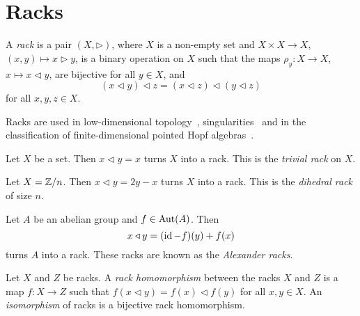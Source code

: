 \chapter{Racks}

\begin{definition}
\label{defn:rack}
A \emph{rack} is a pair $(X,\triangleright)$, 
where $X$ is a non-empty set and 
$X\times X\to X$, $(x,y)\mapsto x\triangleright y$, is a binary operation on $X$ such that
the maps $\rho_y\colon X\to X$, $x\mapsto x\triangleleft y$, are bijective for all $y\in X$, and 
\begin{equation}
\label{eq:rack}
(x\triangleleft y)\triangleleft z=(x\triangleleft z)\triangleleft (y\triangleleft z)
\end{equation}
for all $x,y,z\in X$.
\end{definition}

Racks are used in low-dimensional topology~\cite{MR3379534}, singularities~\cite{MR975077} 
and in the classification of finite-dimensional pointed Hopf algebras~\cite{MR1994219}.

\begin{example}
    Let $X$ be a set. Then $x\triangleleft y=x$ turns $X$ into a rack. 
    This is the \emph{trivial rack} on $X$. 
\end{example}

\begin{example}
    Let $X=\mathbb{Z}/n$. Then $x\triangleleft y=2y-x$ turns $X$ into a rack. This is 
    the \emph{dihedral rack} of size $n$. 
\end{example}

\begin{example}
    Let $A$ be an abelian group and $f\in\operatorname{Aut}(A)$. Then 
    \[
    x\triangleleft y=(\operatorname{id}-f)(y)+f(x)
    \]
    turns $A$ into a rack. These racks 
    are known as the \emph{Alexander racks}.
\end{example}

\begin{definition}
    Let $X$ and $Z$ be racks. 
    A \emph{rack homomorphism} between the racks $X$ and $Z$ is a map $f\colon X\to Z$ such that 
    $f(x\triangleleft y)=f(x)\triangleleft f(y)$ for all $x,y\in X$. 
    An \emph{isomorphism} of racks is a bijective rack homomorphism. 
\end{definition}

